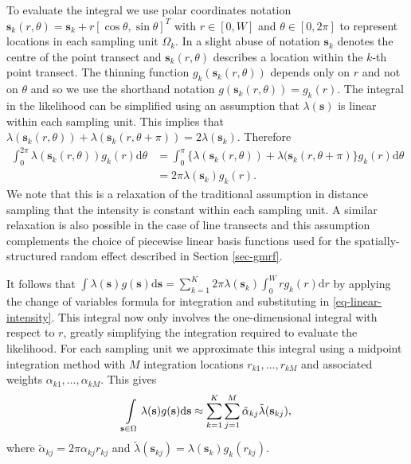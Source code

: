 \documentclass{statsoc}
\newcommand{\bs}{\mathbf{s}}
\newcommand{\tl}{\tilde{\lambda}}   %
\begin{document}
To evaluate the integral we use polar coordinates notation $\bs_k(r, \theta) = \bs_k + r\left[\cos\theta, \sin\theta \right]^T$ with $r \in [0, W]$ and $\theta \in [0, 2\pi]$ to represent locations in each sampling unit $\Omega_k$.  In a slight abuse of notation $\bs_k$ denotes the centre of the point transect and $\bs_k(r,\theta)$ describes a location within the $k$-th point transect. The thinning function $g_k(\bs_k(r, \theta))$ depends only on $r$ and not on $\theta$ and so we use the shorthand notation $ g(\bs_k(r, \theta)) = g_k(r)$. The integral in the likelihood can be simplified using an assumption that $\lambda(\bs)$ is linear within each sampling unit.  This implies that $\lambda(\bs_k(r, \theta)) + \lambda(\bs_k(r, \theta + \pi)) = 2\lambda(\bs_k)$.  Therefore
\begin{align}
\label{eq-linear-intensity}
	\int_0^{2\pi} \lambda(\bs_k(r, \theta))g_k(r)\mathrm{d}\theta &= \int_0^\pi \{\lambda(\bs_k(r, \theta)) + \lambda(\bs_k(r, \theta + \pi) \} g_k(r)\mathrm{d}\theta \nonumber \\
	&= 2\pi \lambda(\bs_k)g_k(r).
\end{align}
We note that this is a relaxation of the traditional assumption in distance sampling that the intensity is constant within each sampling unit.  A similar relaxation is also possible in the case of line transects \citep{yuan_point_2017} and this assumption complements the choice of piecewise linear basis functions used for the spatially-structured random effect described in Section \ref{sec-gmrf}.  

It follows that $\int \lambda(\bs)g(\bs) \mathrm{d}\bs = \sum_{k=1}^K 2\pi \lambda(\bs_k) \int_0^W r g_k(r)\mathrm{d}r$ by applying the change of variables formula for integration and substituting in \eqref{eq-linear-intensity}.  This integral now only involves the one-dimensional integral with respect to $r$, greatly simplifying the integration required to evaluate the likelihood.  For each sampling unit we approximate this integral using a midpoint integration method with $M$ integration locations $r_{k1}, \ldots, r_{kM}$ and associated weights $\alpha_{k1}, \ldots, \alpha_{kM}$.  This gives
\begin{equation*}
	\int\displaylimits_{\bs \in \Omega} \lambda(\bs)g(\bs)\mathrm{d}\bs \approx \sum_{k=1}^K \sum_{j=1}^M \tilde{\alpha}_{kj} \tl(\bs_{kj}) ,
\end{equation*}
where $\tilde{\alpha}_{kj} = 2\pi \alpha_{kj}r_{kj}$ and $\tl(\bs_{kj}) = \lambda(\bs_k) g_k(r_{kj})$.
\end{document}
